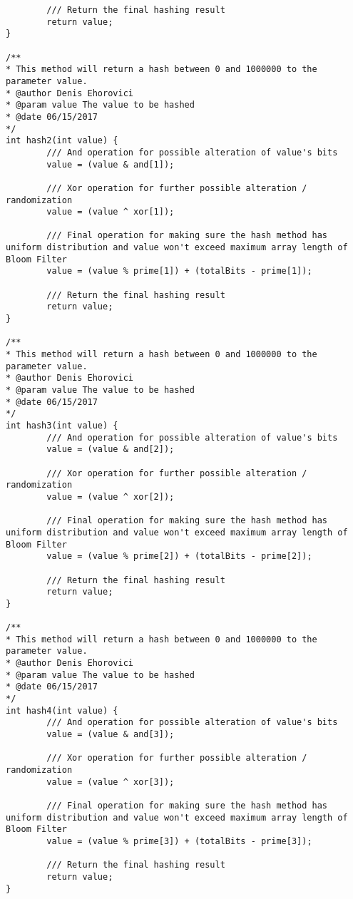 \documentclass[14pt]{article}
\begin{document}
\begin{lstlisting}
        /// Return the final hashing result
        return value;
}

/**
* This method will return a hash between 0 and 1000000 to the parameter value.
* @author Denis Ehorovici
* @param value The value to be hashed
* @date 06/15/2017
*/
int hash2(int value) {
        /// And operation for possible alteration of value's bits
        value = (value & and[1]);

        /// Xor operation for further possible alteration / randomization
        value = (value ^ xor[1]);

        /// Final operation for making sure the hash method has uniform distribution and value won't exceed maximum array length of Bloom Filter
        value = (value % prime[1]) + (totalBits - prime[1]);

        /// Return the final hashing result
        return value;
}

/**
* This method will return a hash between 0 and 1000000 to the parameter value.
* @author Denis Ehorovici
* @param value The value to be hashed
* @date 06/15/2017
*/
int hash3(int value) {
        /// And operation for possible alteration of value's bits
        value = (value & and[2]);

        /// Xor operation for further possible alteration / randomization
        value = (value ^ xor[2]);

        /// Final operation for making sure the hash method has uniform distribution and value won't exceed maximum array length of Bloom Filter
        value = (value % prime[2]) + (totalBits - prime[2]);

        /// Return the final hashing result
        return value;
}

/**
* This method will return a hash between 0 and 1000000 to the parameter value.
* @author Denis Ehorovici
* @param value The value to be hashed
* @date 06/15/2017
*/
int hash4(int value) {
        /// And operation for possible alteration of value's bits
        value = (value & and[3]);

        /// Xor operation for further possible alteration / randomization
        value = (value ^ xor[3]);

        /// Final operation for making sure the hash method has uniform distribution and value won't exceed maximum array length of Bloom Filter
        value = (value % prime[3]) + (totalBits - prime[3]);

        /// Return the final hashing result
        return value;
}


\end{lstlisting}
\end{document}
